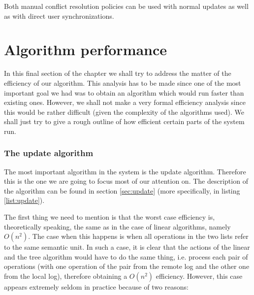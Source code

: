 Both manual conflict resolution policies can be used with normal updates as well as with direct user
synchronizations.

\section{Algorithm performance}

In this final section of the chapter we shall try to address the matter of the efficiency of our algorithm.
This analysis has to be made since one of the most important goal we had was to obtain an algorithm which
would run faster than existing ones. However, we shall not make a very formal efficiency analysis since
this would be rather difficult (given the complexity of the algorithms used). We shall just try to give a
rough outline of how efficient certain parts of the system run.

\subsubsection{The update algorithm}

The most important algorithm in the system is the update algorithm. Therefore this is the one we are going
to focus most of our attention on. The description of the algorithm can be found in section \ref{sec:update}
(more specifically, in listing \ref{list:update}).

The first thing we need to mention is that the worst case efficiency is, theoretically speaking, the same
as in the case of linear algorithms, namely $O(n^2)$. The case when this happens is when all operations
in the two lists refer to the same semantic unit. In such a case, it is clear that the actions of the linear
and the tree algorithm would have to do the same thing, i.e. process each pair of operations (with one operation
of the pair from the remote log and the other one from the local log), therefore obtaining a $O(n^2)$ efficiency. However, this case appears extremely seldom in practice because of two reasons:

